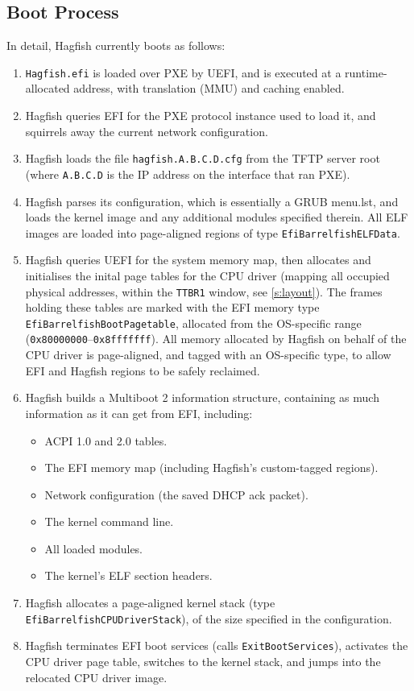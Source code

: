 \documentclass[a4paper,twoside]{report}
\begin{document}
\subsection{Boot Process}

In detail, Hagfish currently boots as follows:

\begin{enumerate}
\item \texttt{Hagfish.efi} is loaded over PXE by UEFI, and is executed at a
runtime-allocated address, with translation (MMU) and caching enabled.
\item Hagfish queries EFI for the PXE protocol instance used to load it, and
squirrels away the current network configuration.
\item Hagfish loads the file \texttt{hagfish.A.B.C.D.cfg} from the TFTP server
root (where \texttt{A.B.C.D} is the IP address on the interface that ran PXE).
\item Hagfish parses its configuration, which is essentially a GRUB menu.lst,
and loads the kernel image and any additional modules specified therein. All
ELF images are loaded into page-aligned regions of type
\texttt{EfiBarrelfishELFData}.
\item Hagfish queries UEFI for the system memory map, then allocates and
initialises the inital page tables for the CPU driver (mapping all occupied
physical addresses, within the \texttt{TTBR1} window, see \autoref{s:layout}).
The frames holding these tables are marked with the EFI memory type\\
\texttt{EfiBarrelfishBootPagetable}, allocated from the OS-specific range
(\texttt{0x80000000}--\texttt{0x8fffffff}). All memory allocated by Hagfish on
behalf of the CPU driver is page-aligned, and tagged with an OS-specific type,
to allow EFI and Hagfish regions to be safely reclaimed.
\item Hagfish builds a Multiboot 2 information structure, containing as much
information as it can get from EFI, including:
    \begin{itemize}
    \item ACPI 1.0 and 2.0 tables.
    \item The EFI memory map (including Hagfish's custom-tagged regions).
    \item Network configuration (the saved DHCP ack packet).
    \item The kernel command line.
    \item All loaded modules.
    \item The kernel's ELF section headers.
    \end{itemize}
\item Hagfish allocates a page-aligned kernel stack (type
\texttt{EfiBarrelfishCPUDriverStack}), of the size specified in the
configuration.
\item Hagfish terminates EFI boot services (calls \texttt{ExitBootServices}),
activates the CPU driver page table, switches to the kernel stack, and jumps
into the relocated CPU driver image.
\end{enumerate}
\end{document}
